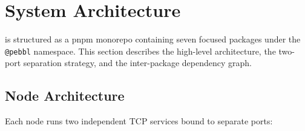 \section{System Architecture}
\label{sec:arch}

\pebble{} is structured as a pnpm monorepo containing seven focused packages
under the \texttt{@pebbl} namespace. This section describes the high-level
architecture, the two-port separation strategy, and the inter-package dependency
graph.

\subsection{Node Architecture}

Each \pebble{} node runs two independent TCP services bound to separate ports:

